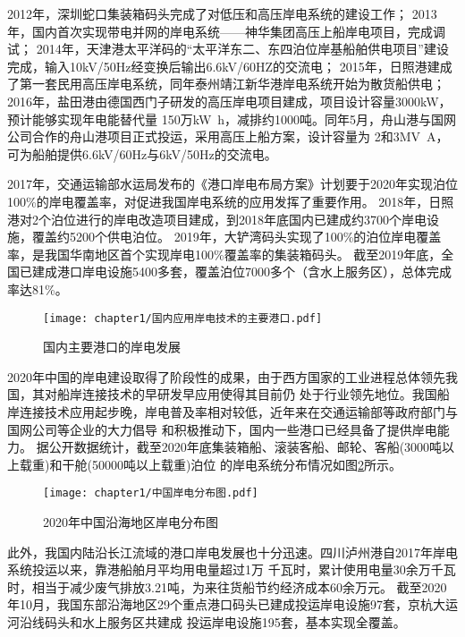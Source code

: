 2012年，深圳蛇口集装箱码头完成了对低压和高压岸电系统的建设工作；
2013年，国内首次实现带电并网的岸电系统——神华集团高压上船岸电项目，完成调试\cite{SP8}；
2014年，天津港太平洋码的“太平洋东二、东四泊位岸基船舶供电项目”建设完成，输入10kV/50Hz经变换后输出6.6kV/60HZ的交流电；
2015年，日照港建成了第一套民用高压岸电系统\cite{SP9}，同年泰州靖江新华港岸电系统开始为散货船供电；
2016年，盐田港由德国西门子研发的高压岸电项目建成，项目设计容量3000kW，预计能够实现年电能替代量
150万\si{kW.h}，减排约1000吨。同年5月，舟山港与国网公司合作的舟山港项目正式投运，采用高压上船方案，设计容量为
2和3\si{MV.A}，可为船舶提供6.6kV/60Hz与6kV/50Hz的交流电\cite{SP10}。

2017年，交通运输部水运局发布的《港口岸电布局方案》计划要于2020年实现泊位100\%的岸电覆盖率，对促进我国岸电系统的应用发挥了重要作用。
2018年，日照港对2个泊位进行的岸电改造项目建成，到2018年底国内已建成约3700个岸电设施，覆盖约5200个供电泊位。
2019年，大铲湾码头实现了100\%的泊位岸电覆盖率，是我国华南地区首个实现岸电100\%覆盖率的集装箱码头\cite{SP11}。
截至2019年底，全国已建成港口岸电设施5400多套，覆盖泊位7000多个（含水上服务区），总体完成率达81\%\cite{SP12}。

\begin{figure}[!htp]
	\centering
	\texttt{[image: chapter1/国内应用岸电技术的主要港口.pdf]}
	\caption{国内主要港口的岸电发展}
	\label{fig:国内主要港口的岸电发展}
\end{figure}

2020年中国的岸电建设取得了阶段性的成果，由于西方国家的工业进程总体领先我国，其对船岸连接技术的早研发早应用使得其目前仍
处于行业领先地位。我国船岸连接技术应用起步晚，岸电普及率相对较低，近年来在交通运输部等政府部门与国网公司等企业的大力倡导
和积极推动下，国内一些港口已经具备了提供岸电能力。
据公开数据统计，截至2020年底集装箱船、滚装客船、邮轮、客船(3000吨以上载重)和干舱(50000吨以上载重)泊位
的岸电系统分布情况如图\ref{fig:中国岸电分布图}所示。

\begin{figure}[!htp]
	\centering
	\texttt{[image: chapter1/中国岸电分布图.pdf]}
	\caption{ 2020年中国沿海地区岸电分布图}
	\label{fig:中国岸电分布图}
\end{figure}

此外，我国内陆沿长江流域的港口岸电发展也十分迅速\cite{SP17}。四川泸州港自2017年岸电系统投运以来，靠港船舶月平均用电量超过1万
千瓦时，累计使用电量30余万千瓦时，相当于减少废气排放3.21吨，为来往货船节约经济成本60余万元。
截至2020年10月，我国东部沿海地区29个重点港口码头已建成投运岸电设施97套，京杭大运河沿线码头和水上服务区共建成
投运岸电设施195套，基本实现全覆盖。

